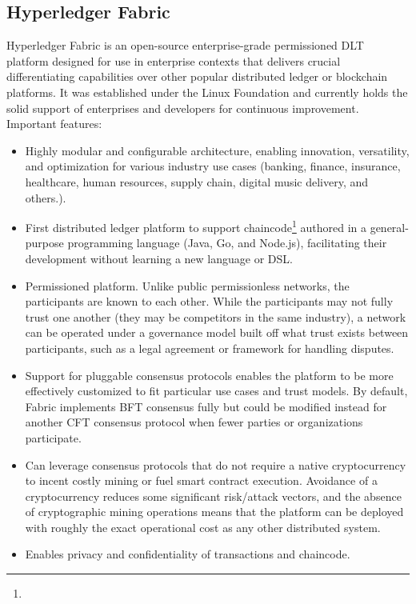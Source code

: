 \subsection{Hyperledger Fabric}
\label{ch:approach:intro:hyperledger}
Hyperledger Fabric is an open-source enterprise-grade permissioned \ac{DLT} platform designed for use in enterprise contexts that delivers crucial differentiating capabilities over other popular distributed ledger or blockchain platforms. It was established under the Linux Foundation and currently holds the solid support of enterprises and developers for continuous improvement. 
Important features:
\begin{itemize}
    \item Highly modular and configurable architecture, enabling innovation, versatility, and optimization for various industry use cases (banking, finance, insurance, healthcare, human resources, supply chain, digital music delivery, and others.).
    
    \item First distributed ledger platform to support chaincode\footnote{} authored in a general-purpose programming language (Java, Go, and Node.js), facilitating their development without learning a new language or \ac{DSL}.
    
    \item Permissioned platform. Unlike public permissionless networks, the participants are known to each other. While the participants may not fully trust one another (they may be competitors in the same industry), a network can be operated under a governance model built off what trust exists between participants, such as a legal agreement or framework for handling disputes.

    \item Support for pluggable consensus protocols enables the platform to be more effectively customized to fit particular use cases and trust models. By default, Fabric implements BFT consensus fully but could be modified instead for another  \ac{CFT} consensus protocol when fewer parties or organizations participate.

    \item Can leverage consensus protocols that do not require a native cryptocurrency to incent costly mining or fuel smart contract execution. Avoidance of a cryptocurrency reduces some significant risk/attack vectors, and the absence of cryptographic mining operations means that the platform can be deployed with roughly the exact operational cost as any other distributed system.

    \item Enables privacy and confidentiality of transactions and chaincode.

\end{itemize}
 
